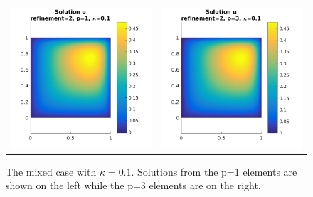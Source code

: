 \documentclass{article}
\begin{document}
\begin{figure}[!ht]
\begin{tabular}{c c}
\includegraphics[scale=0.7]{umu_132.png} & 
\includegraphics[scale=0.7]{umu_232.png}
\end{tabular}
\caption{The mixed case with $\kappa = 0.1$. Solutions from the p=1 elements are shown on the left while the p=3 elements are on the right.}
\label{fig:u100}
\end{figure}
\end{document}
